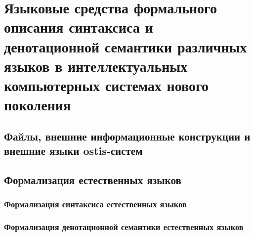 \chapter{Языковые средства формального описания синтаксиса и денотационной семантики различных языков в интеллектуальных компьютерных системах нового поколения}
\label{chapter_lang}


\section{Файлы, внешние информационные конструкции и внешние языки ostis-систем}
\section{Формализация естественных языков}
\subsection{Формализация синтаксиса естественных языков}
\subsection{Формализация денотационной семантики естественных языков}

%